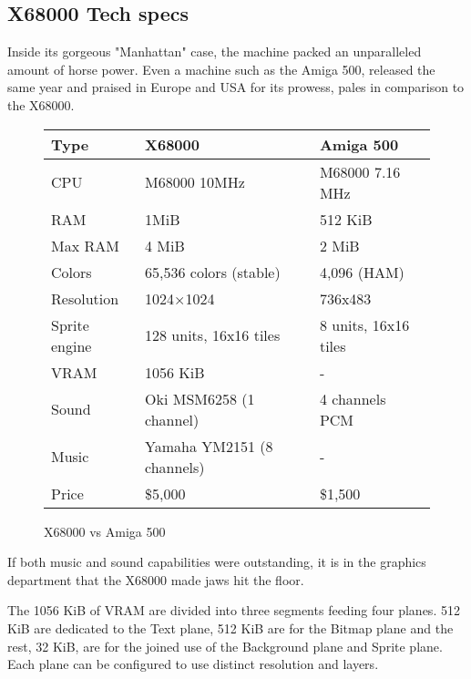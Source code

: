 \pagebreak



\subsection{X68000 Tech specs}  
Inside its gorgeous "Manhattan" case, the machine packed an unparalleled amount of horse power. Even a machine such as the Amiga 500, released the same year and praised in Europe and USA for its prowess, pales in comparison to the X68000. 


 \begin{figure}[H]
\begin{tabularx}{\textwidth}{lXX}
  \toprule    
  \textbf{Type } & \textbf{ X68000 } & \textbf{ Amiga 500 }\\  
  \toprule   
    
CPU & M68000 10MHz & M68000 7.16 MHz\\  
RAM & 1MiB & 512 KiB\\
Max RAM & 4 MiB & 2 MiB\\ 
Colors  & 65,536 colors (stable) & 4,096 (HAM) \\
Resolution & 1024×1024 & 736x483 \\
Sprite engine & 128 units, 16x16 tiles & 8 units, 16x16 tiles\\
VRAM & 1056 KiB & -\\
Sound & Oki MSM6258 (1 channel)  & 4 channels PCM\\ 
Music & Yamaha YM2151 (8 channels)  & -\\ 
Price & \$5,000 & \$1,500 \\
  \toprule   
\end{tabularx}
\caption*{X68000 vs Amiga 500}
\end{figure}


If both music and sound capabilities were outstanding, it is in the graphics department that the X68000 made jaws hit the floor.

The 1056 KiB of VRAM are divided into three segments feeding four planes. 512 KiB are dedicated to the Text plane, 512 KiB are for the Bitmap plane and the rest, 32 KiB, are for the joined use of the Background plane and Sprite plane. Each plane can be configured to use distinct resolution and layers.

